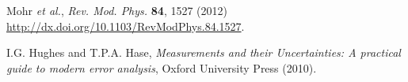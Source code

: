 \documentclass[a4paper]{report}
\begin{document}
\begin{thebibliography}{99}
 Mohr \textit{et al.}, {\sl Rev. Mod. Phys.} {\bf 84}, 1527 (2012) \url{http://dx.doi.org/10.1103/RevModPhys.84.1527}.

 I.G. Hughes and T.P.A. Hase, \textit{Measurements and their Uncertainties: A practical guide to modern error analysis}, Oxford University Press (2010).
\end{thebibliography}
\end{document}
